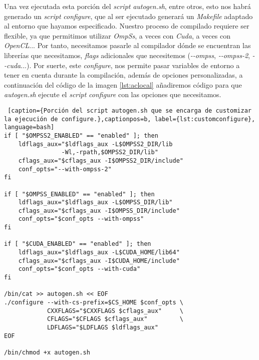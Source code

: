 Una vez ejecutada esta porción del \textit{script} \textit{autogen.sh}, entre otros, esto nos habrá generado un \textit{script} \textit{configure}, que al ser ejecutado generará un \textit{Makefile} adaptado al entorno que hayamos especificado. Nuestro proceso de compilado requiere ser flexible, ya que permitimos utilizar \textit{OmpSs}, a veces con \textit{Cuda}, a veces con \textit{OpenCL}... Por tanto, necesitamos pasarle al compilador dónde se encuentran las librerías que necesitamos, \textit{flags} adicionales que necesitemos (\textit{-{}-ompss}, \textit{-{}-ompss-2}, \textit{-{}-cuda}...). Por suerte, este \textit{configure}, nos permite pasar variables de entorno a tener en cuenta durante la compilación, además de opciones personalizadas, a continuación del código de la imagen \ref{lst:aclocal} añadiremos código para que \textit{autogen.sh} ejecute el \textit{script} \textit{configure} con las opciones que necesitamos.
\par\bigskip

\begin{lstlisting} [caption={Porción del script autogen.sh que se encarga de customizar la ejecución de configure.},captionpos=b, label={lst:customconfigure}, language=bash]                                                                                                                                               
if [ "$OMPSS2_ENABLED" == "enabled" ]; then
    ldflags_aux="$ldflags_aux -L$OMPSS2_DIR/lib
                -Wl,-rpath,$OMPSS2_DIR/lib"
    cflags_aux="$cflags_aux -I$OMPSS2_DIR/include"
    conf_opts="--with-ompss-2"
fi

if [ "$OMPSS_ENABLED" == "enabled" ]; then
    ldflags_aux="$ldflags_aux -L$OMPSS_DIR/lib"
    cflags_aux="$cflags_aux -I$OMPSS_DIR/include"
    conf_opts="$conf_opts --with-ompss"
fi

if [ "$CUDA_ENABLED" == "enabled" ]; then
    ldflags_aux="$ldflags_aux -L$CUDA_HOME/lib64"
    cflags_aux="$cflags_aux -I$CUDA_HOME/include"
    conf_opts="$conf_opts --with-cuda"
fi

/bin/cat >> autogen.sh << EOF
./configure --with-cs-prefix=$CS_HOME $conf_opts \ 
            CXXFLAGS="$CXXFLAGS $cflags_aux"     \  
            CFLAGS="$CFLAGS $cflags_aux"         \
            LDFLAGS="$LDFLAGS $ldflags_aux" 
EOF

/bin/chmod +x autogen.sh
\end{lstlisting}


